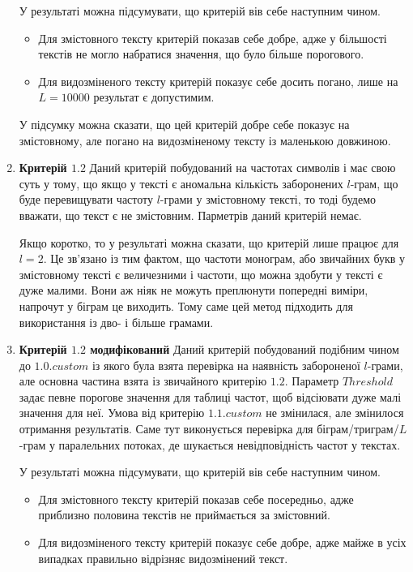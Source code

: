 \begin{enumerate}
        У результаті можна підсумувати, що критерій вів себе наступним чином.
        \begin{itemize}
            \item Для змістовного тексту критерій показав себе добре, адже у більшості текстів не могло набратися значення, що було більше порогового. 
            \item Для видозміненого тексту критерій показує себе досить погано, лише на  $L=10000$ результат є допустимим. 
        \end{itemize}

        У підсумку можна сказати, що цей критерій добре себе показує на змістовному, але погано на видозміненому тексту із маленькою довжиною. 
        
    \item \textbf{Критерій $1.2$}
        Даний критерій побудований на частотах символів і має свою суть у тому, що якщо у тексті є аномальна кількість заборонених $l$-грам, що буде перевищувати частоту $l$-грами у змістовному тексті, то тоді будемо вважати, що текст є не змістовним. Парметрів даний критерій немає.

        Якщо коротко, то у результаті можна сказати, що критерій лише працює для $l=2$. Це зв'язано із тим фактом, що частоти монограм, або звичайних букв у змістовному тексті є величезними і частоти, що можна здобути у тексті є дуже малими. Вони аж ніяк не можуть преплюнути попередні виміри, напрочут у біграм це виходить. Тому саме цей метод підходить для використання із дво- і більше грамами.
    
    \item \textbf{Критерій $1.2$ модифікований}
        Даний критерій побудований подібним чином до $1.0.custom$ із якого була взята перевірка на наявність забороненої $l$-грами, але основна частина взята із звичайного критерію $1.2$. Параметр $Threshold$ задає певне порогове значення для таблиці частот, щоб відсіювати дуже малі значення для неї. Умова від критерію $1.1.custom$ не змінилася, але змінилося отримання результатів. Саме тут виконується перевірка для біграм/триграм/$L$-грам у паралельних потоках, де шукається невідповідність частот у текстах.

        У результаті можна підсумувати, що критерій вів себе наступним чином.
        \begin{itemize}
            \item Для змістовного тексту критерій показав себе посередньо, адже приблизно половина текстів не приймається за змістовний.
            \item Для видозміненого тексту критерій показує себе добре, адже майже в усіх випадках правильно відрізняє видозмінений текст. 
        \end{itemize}


\end{enumerate}
